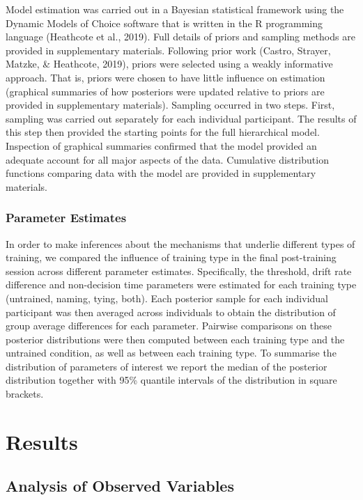 \documentclass[
  man, donotrepeattitle,floatsintext]{apa6}
\begin{document}
Model estimation was carried out in a Bayesian statistical framework using the Dynamic Models of Choice software that is written in the R programming language (Heathcote et al., 2019). Full details of priors and sampling methods are provided in supplementary materials. Following prior work (Castro, Strayer, Matzke, \& Heathcote, 2019), priors were selected using a weakly informative approach. That is, priors were chosen to have little influence on estimation (graphical summaries of how posteriors were updated relative to priors are provided in supplementary materials). Sampling occurred in two steps. First, sampling was carried out separately for each individual participant. The results of this step then provided the starting points for the full hierarchical model. Inspection of graphical summaries confirmed that the model provided an adequate account for all major aspects of the data. Cumulative distribution functions comparing data with the model are provided in supplementary materials.

\subsubsection{Parameter Estimates}\label{parameter-estimates}

In order to make inferences about the mechanisms that underlie different types of training, we compared the influence of training type in the final post-training session across different parameter estimates. Specifically, the threshold, drift rate difference and non-decision time parameters were estimated for each training type (untrained, naming, tying, both). Each posterior sample for each individual participant was then averaged across individuals to obtain the distribution of group average differences for each parameter. Pairwise comparisons on these posterior distributions were then computed between each training type and the untrained condition, as well as between each training type. To summarise the distribution of parameters of interest we report the median of the posterior distribution together with 95\% quantile intervals of the distribution in square brackets.

\section{Results}\label{results}

\subsection{Analysis of Observed Variables}\label{analysis-of-observed-variables}
\end{document}
